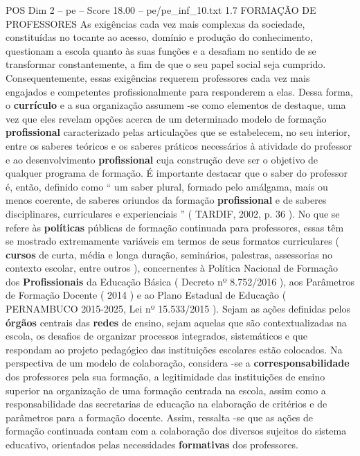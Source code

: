 \begin{textsample}{POS Dim 2 – pe – Score 18.00 – pe/pe\_inf\_10.txt}  \label{ex:f2_pos_256}
1.7 FORMAÇÃO DE PROFESSORES As exigências cada vez mais complexas da sociedade, constituídas no tocante ao acesso, domínio e produção do conhecimento, questionam a escola quanto às suas funções e a desafiam no sentido de se transformar constantemente, a fim de que o seu papel social seja cumprido.
Consequentemente, essas exigências requerem professores cada vez mais engajados e competentes profissionalmente para responderem a elas.
Dessa forma, o \textbf{currículo} e a sua organização assumem -se como elementos de destaque, uma vez que eles revelam opções acerca de um determinado modelo de formação \textbf{profissional} caracterizado pelas articulações que se estabelecem, no seu interior, entre os saberes teóricos e os saberes práticos necessários à atividade do professor e ao desenvolvimento \textbf{profissional} cuja construção deve ser o objetivo de qualquer programa de formação.
É importante destacar que o saber do professor é, então, definido como “ um saber plural, formado pelo amálgama, mais ou menos coerente, de saberes oriundos da formação \textbf{profissional} e de saberes disciplinares, curriculares e experienciais ” ( TARDIF, 2002, p. 36 ).
No que se refere às \textbf{políticas} públicas de formação continuada para professores, essas têm se mostrado extremamente variáveis em termos de seus formatos curriculares ( \textbf{cursos} de curta, média e longa duração, seminários, palestras, assessorias no contexto escolar, entre outros ), concernentes à Política Nacional de Formação dos \textbf{Profissionais} da Educação Básica ( Decreto nº 8.752/2016 ), aos Parâmetros de Formação Docente ( 2014 ) e ao Plano Estadual de Educação ( PERNAMBUCO 2015-2025, Lei nº 15.533/2015 ).
Sejam as ações definidas pelos \textbf{órgãos} centrais das \textbf{redes} de ensino, sejam aquelas que são contextualizadas na escola, os desafios de organizar processos integrados, sistemáticos e que respondam ao projeto pedagógico das instituições escolares estão colocados.
Na perspectiva de um modelo de colaboração, considera -se a \textbf{corresponsabilidade} dos professores pela sua formação, a legitimidade das instituições de ensino superior na organização de uma formação centrada na escola, assim como a responsabilidade das secretarias de educação na elaboração de critérios e de parâmetros para a formação docente.
Assim, ressalta -se que as ações de formação continuada contam com a colaboração dos diversos sujeitos do sistema educativo, orientados pelas necessidades \textbf{formativas} dos professores.

\end{textsample}
